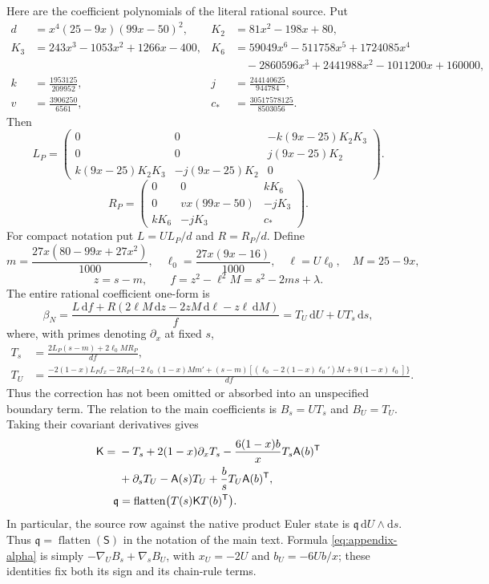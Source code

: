 \documentclass[11pt,a4paper]{article}
\newcommand{\dd}{\mathrm d}
\begin{document}
Here are the coefficient polynomials of the literal rational source.
Put
\begin{align*}
 d&=x^4(25-9x)(99x-50)^2,&
 K_2&=81x^2-198x+80,\\
 K_3&=243x^3-1053x^2+1266x-400,&
 K_6&=59049x^6-511758x^5+1724085x^4\\
 &&&\quad-2860596x^3+2441988x^2-1011200x+160000,\\
 k&=\frac{1953125}{209952},&j&=\frac{244140625}{944784},\\
 v&=\frac{3906250}{6561},&c_*&=\frac{30517578125}{8503056}.
\end{align*}
Then
\[
 L_P=\begin{pmatrix}
 0&0&-k(9x-25)K_2K_3\\
 0&0&j(9x-25)K_2\\
 k(9x-25)K_2K_3&-j(9x-25)K_2&0
 \end{pmatrix}.
\]
\[
 R_P=\begin{pmatrix}
 0&0&kK_6\\0&vx(99x-50)&-jK_3\\kK_6&-jK_3&c_*
 \end{pmatrix}.
\]
For compact notation put \(L=U L_P/d\) and \(R=R_P/d\).  Define
\[
 m=\frac{27x(80-99x+27x^2)}{1000},\quad
 \ell_0=\frac{27x(9x-16)}{1000},\quad
 \ell=U\ell_0,\quad M=25-9x,
\]
\[
 z=s-m,\qquad f=z^2-\ell^2M=s^2-2ms+\lambda.
\]
The entire rational coefficient one-form is
\begin{equation}\label{eq:appendix-beta}
 \beta_N=\frac{L\,\dd f+R(2\ell M\,\dd z-2zM\,\dd\ell-z\ell\,\dd M)}{f}
           =T_U\,\dd U+U T_s\,\dd s,
\end{equation}
where, with primes denoting \(\partial_x\) at fixed \(s\),
\begin{align}
 T_s&=\frac{2L_P(s-m)+2\ell_0M R_P}{df},\label{eq:appendix-Ts}\\
 T_U&=\frac{-2(1-x)L_P f_x
 -2R_P\{-2\ell_0(1-x)Mm'+(s-m)[(\ell_0-2(1-x)\ell_0')M+9(1-x)\ell_0]\}}{df}.
 \label{eq:appendix-TU}
\end{align}
Thus the correction has not been omitted or absorbed into an unspecified
boundary term.  The relation to the main coefficients is \(B_s=UT_s\) and \(B_U=T_U\).
Taking their covariant derivatives gives
\begin{align}
 \mathsf K={}&-T_s+2(1-x)\partial_xT_s
 -\frac{6(1-x)b}{x}T_s \mathsf A(b)^{\mathsf T}\notag\\
 &+\partial_sT_U-\mathsf A(s)T_U+\frac bsT_U \mathsf A(b)^{\mathsf T},
 \label{eq:appendix-alpha}\\
 \mathfrak q&=\operatorname{flatten}\bigl(T(s)\mathsf K T(b)^{\mathsf T}\bigr).
 \label{eq:appendix-Q}
\end{align}
In particular, the source row against the native product
Euler state is \(\mathfrak q\,\dd U\wedge\dd s\).
Thus \(\mathfrak q=\operatorname{flatten}(\mathsf S)\) in
the notation of the main text. Formula
\eqref{eq:appendix-alpha} is simply
\(-\nabla_U B_s+\nabla_s B_U\), with \(x_U=-2U\) and
\(b_U=-6Ub/x\); these identities fix both its sign and its chain-rule
terms.
\end{document}
